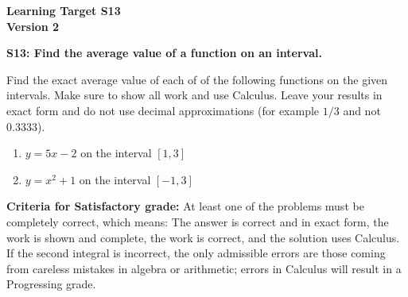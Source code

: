 \documentclass[10pt]{article}
\begin{document}
	\vspace*{0in}

		\begin{center}
			\textbf{Learning Target S13 \\
			Version 2} 
		\end{center}


\begin{framed}
	\textbf{S13: Find the average value of a function on an interval.}
\end{framed}

Find the exact average value of each of of the following functions on the given intervals. Make sure to show all work and use Calculus. Leave your results in exact form and do not use decimal approximations (for example $1/3$ and not $0.3333$). 

\begin{enumerate}
    \item $y = 5x - 2$ on the interval $[1,3]$
    \item $y = x^2 + 1$ on the interval $[-1,3]$
\end{enumerate}

\vfill


\begin{small}
    \begin{framed}
        	\textbf{Criteria for Satisfactory grade:} At least one of the problems must be completely correct, which means: The answer is correct and in exact form, the work is shown and complete, the work is correct, and the solution uses Calculus. If the second  integral is incorrect, the only admissible errors are those coming from careless mistakes in algebra or arithmetic; errors in Calculus will result in a Progressing grade. 
    \end{framed}

\end{small}
\end{document}
